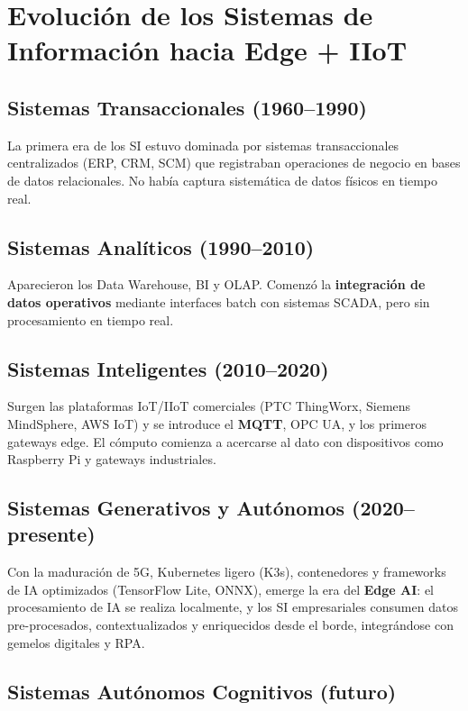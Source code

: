﻿\documentclass[12pt,a4paper,oneside]{article}
\begin{document}
\section{Evolución de los Sistemas de Información hacia Edge + IIoT}

\subsection{Sistemas Transaccionales (1960--1990)}

La primera era de los SI estuvo dominada por sistemas transaccionales centralizados (ERP, CRM, SCM) que registraban operaciones de negocio en bases de datos relacionales. No había captura sistemática de datos físicos en tiempo real.

\subsection{Sistemas Analíticos (1990--2010)}

Aparecieron los Data Warehouse, BI y OLAP. Comenzó la \textbf{integración de datos operativos} mediante interfaces batch con sistemas SCADA, pero sin procesamiento en tiempo real.

\subsection{Sistemas Inteligentes (2010--2020)}

Surgen las plataformas IoT/IIoT comerciales (PTC ThingWorx, Siemens MindSphere, AWS IoT) y se introduce el \textbf{MQTT}, OPC UA, y los primeros gateways edge. El cómputo comienza a acercarse al dato con dispositivos como Raspberry Pi y gateways industriales.

\subsection{Sistemas Generativos y Autónomos (2020--presente)}

Con la maduración de 5G, Kubernetes ligero (K3s), contenedores y frameworks de IA optimizados (TensorFlow Lite, ONNX), emerge la era del \textbf{Edge AI}: el procesamiento de IA se realiza localmente, y los SI empresariales consumen datos pre-procesados, contextualizados y enriquecidos desde el borde, integrándose con gemelos digitales y RPA.

\subsection{Sistemas Autónomos Cognitivos (futuro)}
\end{document}
